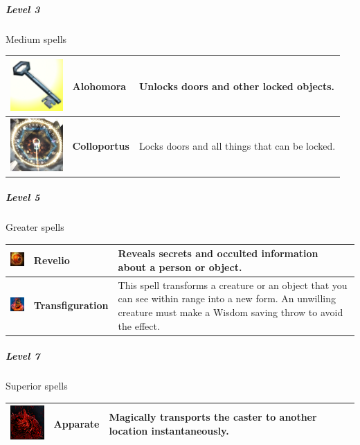 \subparagraph{Level 3} 
Medium spells\\
\begin{tabular}{ m{2cm}m{3cm}m{8cm} } \hline
	\includegraphics[width=2cm]{../Pictures/Gameplay/Spells/Icon/Alohomora_spell_icon.png} & \textbf{Alohomora} & Unlocks doors and other locked objects. \\ \hline
   \includegraphics[width=2cm]{../Pictures/Gameplay/Spells/Icon/Colloportus_spell_icon.png} & \textbf{Colloportus} & Locks doors and all things that can be locked. \\ \hline
\end{tabular}
	

\subparagraph{Level 5} 
Greater spells\\
\begin{tabular}{ m{2cm}m{3cm}m{8cm} } \hline
	\includegraphics[width=2cm]{../Pictures/Gameplay/Spells/Icon/Revelio_spell_icon.jpg} & \textbf{Revelio} & Reveals secrets and occulted information about a person or object.  \\ \hline
	\includegraphics[width=2cm]{../Pictures/Gameplay/Spells/Icon/Transfiguration_spell_icon.png} & \textbf{Transfiguration} & This spell transforms a creature or an object that you can see within range into a new form. An unwilling creature must make a Wisdom saving throw to avoid the effect. \\ \hline
\end{tabular}


\subparagraph{Level 7} 
Superior spells\\
\begin{tabular}{ m{2cm}m{3cm}m{8cm} } \hline
	\includegraphics[width=2cm]{../Pictures/Gameplay/Spells/Icon/Apparate_spell_icon.png} & \textbf{Apparate} & Magically transports the caster to another location instantaneously.  \\ \hline
\end{tabular}

